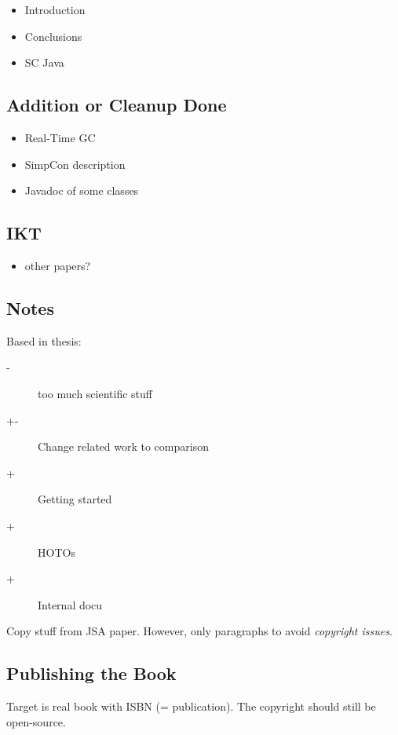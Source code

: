 \begin{itemize}
    \item Introduction
    \item Conclusions
    \item SC Java
\end{itemize}

\subsection{Addition or Cleanup Done}

\begin{itemize}
    \item Real-Time GC
    \item SimpCon description
    \item Javadoc of some classes
\end{itemize}

\subsection{IKT}

\begin{itemize}
    \item other papers?
\end{itemize}
\subsection{Notes}

Based in thesis:
\begin{description}
    \item[-] too much scientific stuff
    \item[+-] Change related work to comparison
    \item[+] Getting started
    \item[+] HOTOs
    \item[+] Internal docu
\end{description}

Copy stuff from JSA paper. However, only paragraphs to avoid
\emph{copyright issues}.

\subsection{Publishing the Book}

Target is real book with ISBN (= publication). The copyright should
still be open-source.

